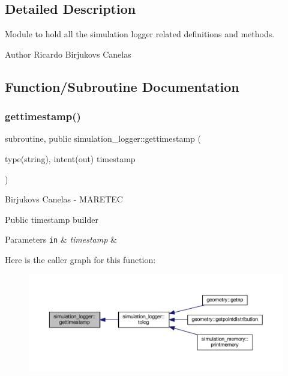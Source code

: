 \subsection{Detailed Description}
Module to hold all the simulation logger related definitions and methods. 

\begin{DoxyAuthor}{Author}
Ricardo Birjukovs Canelas 
\end{DoxyAuthor}


\subsection{Function/\+Subroutine Documentation}
\mbox{\label{namespacesimulation__logger_a13446c36aac51547a72b39003f735257}} 
\subsubsection{\texorpdfstring{gettimestamp()}{gettimestamp()}}
{\footnotesize\ttfamily subroutine, public simulation\+\_\+logger\+::gettimestamp (\begin{DoxyParamCaption}\item[{type(string), intent(out)}]{timestamp }\end{DoxyParamCaption})}



Birjukovs Canelas -\/ M\+A\+R\+E\+T\+EC 

Public timestamp builder 
\begin{DoxyParams}[1]{Parameters}
\mbox{\tt in}  & {\em timestamp} & \\
\hline
\end{DoxyParams}
Here is the caller graph for this function\+:\nopagebreak
\begin{figure}[H]
\begin{center}
\leavevmode
\includegraphics[width=350pt]{namespacesimulation__logger_a13446c36aac51547a72b39003f735257_icgraph}
\end{center}
\end{figure}
\mbox{\label{namespacesimulation__logger_a9c7922c1d3cd57c8322f047799fc6053}} 
